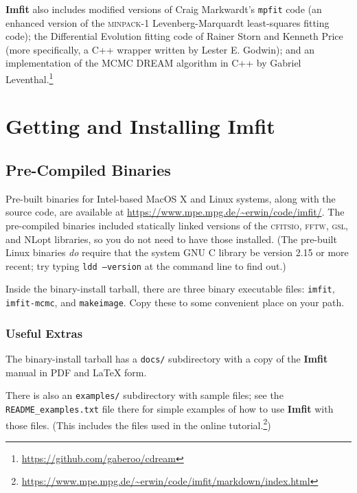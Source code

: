 \documentclass[10pt,a4paper,article]{memoir}
\newcommand{\Imfit}{\textbf{Imfit}}
\newcommand{\imfitprog}{\texttt{imfit}}
\newcommand{\imfitmcmc}{\texttt{imfit-mcmc}}
\newcommand{\makeimage}{\texttt{makeimage}}
\begin{document}
\bigskip

\Imfit{} also includes modified versions of Craig Markwardt's
\texttt{mpfit} code (an enhanced version of the \textsc{minpack-1}
Levenberg-Marquardt least-squares fitting code); the Differential
Evolution fitting code of Rainer Storn and Kenneth Price (more
specifically, a C++ wrapper written by Lester E. Godwin); and
an implementation of the MCMC DREAM algorithm in C++ by Gabriel 
Leventhal.\footnote{\url{https://github.com/gaberoo/cdream}}



\newpage

\chapter{Getting and Installing \Imfit{}}

\section{Pre-Compiled Binaries}

Pre-built binaries for Intel-based MacOS X and Linux systems, along with
the source code, are available at
\url{https://www.mpe.mpg.de/~erwin/code/imfit/}. The pre-compiled
binaries included statically linked versions of the \textsc{cfitsio},
\textsc{fftw}, \textsc{gsl}, and NLopt libraries, so you do not need to
have those installed. (The pre-built Linux binaries \textit{do} require
that the system GNU C library be version 2.15 or more recent; try typing
\texttt{ldd --version} at the command line to find out.)

Inside the binary-install tarball, there are three binary executable
files: \imfitprog, \imfitmcmc, and \makeimage{}. Copy these to some
convenient place on your path.

\subsection{Useful Extras}

The binary-install tarball has a \texttt{docs/} subdirectory with a
copy of the \Imfit{} manual in PDF and \LaTeX{} form.

There is also an \texttt{examples/} subdirectory with sample files; see
the \texttt{README\_examples.txt} file there for simple examples of how
to use \Imfit{} with those files. (This includes the files used in the 
online tutorial.\footnote{\url{https://www.mpe.mpg.de/~erwin/code/imfit/markdown/index.html}})
\end{document}
